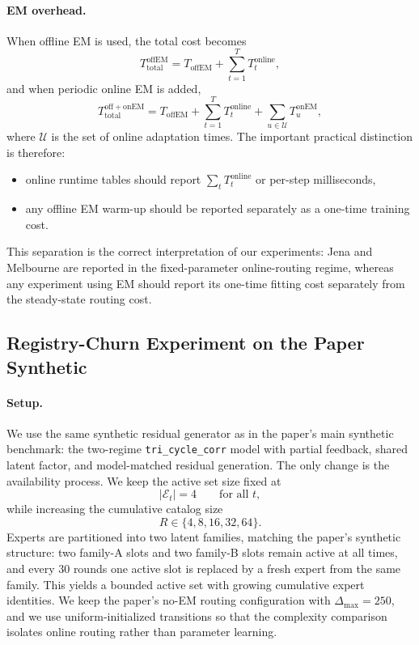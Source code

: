 \paragraph{EM overhead.}
When offline EM is used, the total cost becomes
\begin{equation}
T_{\mathrm{total}}^{\mathrm{offEM}}
=
T_{\mathrm{offEM}}
+
\sum_{t=1}^{T} T_t^{\mathrm{online}},
\label{eq:complexity_offline_em}
\end{equation}
and when periodic online EM is added,
\begin{equation}
T_{\mathrm{total}}^{\mathrm{off+onEM}}
=
T_{\mathrm{offEM}}
+
\sum_{t=1}^{T} T_t^{\mathrm{online}}
+
\sum_{u\in\mathcal U} T_u^{\mathrm{onEM}},
\label{eq:complexity_online_em}
\end{equation}
where \(\mathcal U\) is the set of online adaptation times. The important practical distinction is therefore:
\begin{itemize}[leftmargin=1.5em]
    \item online runtime tables should report \(\sum_t T_t^{\mathrm{online}}\) or per-step milliseconds,
    \item any offline EM warm-up should be reported separately as a one-time training cost.
\end{itemize}
This separation is the correct interpretation of our experiments: Jena and Melbourne are reported in the fixed-parameter online-routing regime, whereas any experiment using EM should report its one-time fitting cost separately from the steady-state routing cost.

\subsection{Registry-Churn Experiment on the Paper Synthetic}
\label{subsec:complexity_registry_experiment}

\paragraph{Setup.}
We use the same synthetic residual generator as in the paper's main synthetic benchmark: the two-regime \texttt{tri\_cycle\_corr} model with partial feedback, shared latent factor, and model-matched residual generation. The only change is the availability process. We keep the active set size fixed at
\begin{equation}
|\mathcal E_t| = 4 \qquad \text{for all } t,
\end{equation}
while increasing the cumulative catalog size
\begin{equation}
R \in \{4,8,16,32,64\}.
\end{equation}
Experts are partitioned into two latent families, matching the paper's synthetic structure: two family-A slots and two family-B slots remain active at all times, and every \(30\) rounds one active slot is replaced by a fresh expert from the same family. This yields a bounded active set with growing cumulative expert identities. We keep the paper's no-EM routing configuration with \(\Delta_{\max}=250\), and we use uniform-initialized transitions so that the complexity comparison isolates online routing rather than parameter learning.

